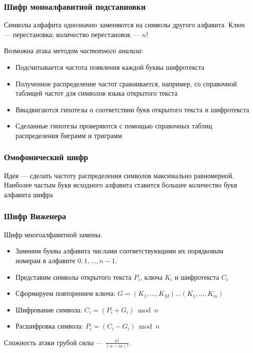 \documentclass[a4paper, 14pt]{extarticle}
\begin{document}
\subsubsection{Шифр моноалфавитной подставновки}
Символы алфафита однозначно заменяются на символы другого алфавита. Ключ --- перестановка; количество перестановок --- $ n! $

Возможна атака методом \textit{частотного анализа}:
\begin{itemize}
    \item Подсчитывается частота появления каждой буквы шифротекста
    \item Полученное распределение частот сравнивается, например, со справочной таблицей частот для символов языка открытого текста
    \item Ввыдвигаются гипотезы о соответствии букв открытого текста и шифротекста
    \item Сделанные гипотезы проверяются с помощью справочных таблиц распределения биграмм и триграмм
\end{itemize}

\subsubsection{Омофонический шифр}
Идея --- сделать частоту распределения символов максимально равномерной. Наиболее частым букв исходного алфавита ставится большее количество букв алфавита шифра

\subsubsection{Шифр Виженера}
Шифр многоалфавитной замены.


\begin{itemize}
    \item Заменим буквы алфавита числами соответствующими их порядковым номерам в алфавите $0, 1, \ldots, n-1$.
    \item Представим символы открытого текста $P_i$, ключа $K_i$ и шифротекста $C_i$
    \item Сформируем  повторением ключа: $G=(K_1, \ldots, K_M) \ldots (K_1, \ldots, K_m)$
    \item Шифрование символа: $C_i = (P_i + G_i) \bmod n$
    \item Расшифровка символа: $P_i = (C_i - G_i) \bmod n$
\end{itemize}
Сложность атаки грубой силы --- $ \frac{n!}{(n-m)!} $. 
\end{document}
